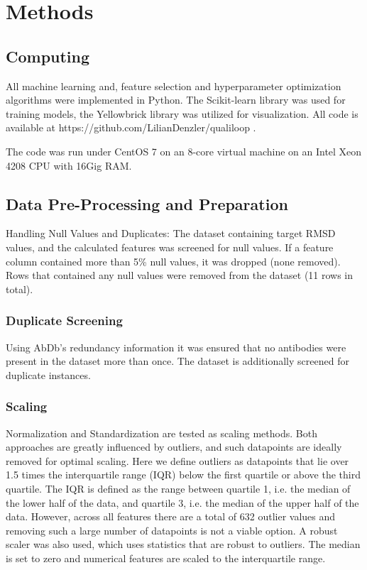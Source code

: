 \documentclass[12pt]{article}
\begin{document}
\section{Methods}

\subsection{Computing}
All machine learning and, feature selection and hyperparameter
optimization algorithms were implemented in Python. The Scikit-learn
library was used for training models, the
Yellowbrick\cite{Bengfort2021} library was utilized for
visualization. All code is available at
https://github.com/LilianDenzler/qualiloop .

The code was run under CentOS 7 on an 8-core virtual machine on an
Intel Xeon 4208 CPU with 16Gig RAM.

\subsection{Data Pre-Processing and Preparation}
Handling Null Values and Duplicates: The dataset containing target
RMSD values, and the calculated features was screened for null
values. If a feature column contained more than 5\% null values, it
was dropped (none removed). Rows that contained any null values were
removed from the dataset (11 rows in total).

\subsubsection{Duplicate Screening}
Using AbDb's redundancy information it was ensured that no antibodies
were present in the dataset more than once. The dataset is
additionally screened for duplicate instances.

\subsubsection{Scaling}
Normalization and Standardization are tested as scaling methods. Both
approaches are greatly influenced by outliers, and such datapoints are
ideally removed for optimal scaling. Here we define outliers as
datapoints that lie over 1.5 times the interquartile range (IQR) below
the first quartile or above the third quartile. The IQR is defined as
the range between quartile 1, i.e. the median of the lower half of the
data, and quartile 3, i.e. the median of the upper half of the
data. However, across all features there are a total of 632 outlier
values and removing such a large number of datapoints is not a viable
option. A robust scaler was also used, which uses statistics that are
robust to outliers. The median is set to zero and numerical features
are scaled to the interquartile range.
\end{document}
